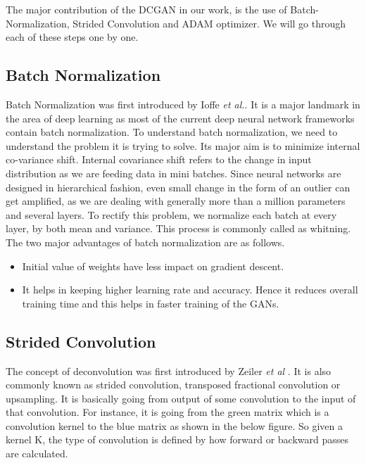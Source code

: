 The major contribution of the DCGAN in our work, is the use of Batch-Normalization, Strided Convolution and ADAM optimizer. We will go through each of these steps one by one.
\subsection{Batch Normalization}

Batch Normalization was first introduced by Ioffe  \textit{et al.}\cite{BatchNorm}. It is a major landmark in the area of deep learning as most of the current deep neural network frameworks contain batch normalization. 
To understand batch normalization, we need to understand the problem it is trying to solve. Its major aim is to minimize internal co-variance shift. Internal covariance shift refers to the change in input distribution as we are feeding data in mini batches. Since neural networks are designed in hierarchical fashion, even small change in the form of an outlier can get amplified, as we are dealing with generally more than a million parameters and several layers. To rectify this problem, we normalize each batch at every layer, by both mean and variance. This process is commonly called as whitning. The two major advantages of batch normalization are as follows.
\begin{itemize}
    \item Initial value of weights have less impact on gradient descent.
    \item It helps in keeping higher learning rate and accuracy. Hence it reduces overall training time and this helps in faster training of the GANs.
\end{itemize}

\subsection{Strided Convolution}

The concept of deconvolution was first introduced by Zeiler \textit{et al} \cite{Deconv}. It is also commonly known as  strided convolution, transposed fractional convolution or upsampling. It is basically going from output of some convolution to the input of that convolution. For instance, it is going from the green matrix which is a convolution kernel to the blue matrix as shown in the below figure. So given a kernel K, the type of convolution is defined by how forward or backward passes are calculated\cite{Deconv-Theano}.


